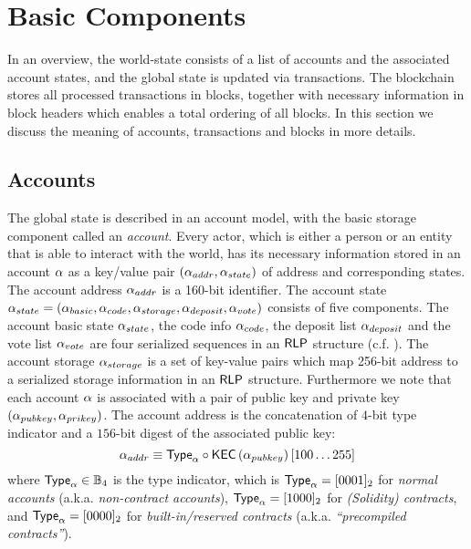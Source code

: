 

\section{Basic Components}
In an overview, the {\name} world-state consists of a list of accounts and the associated account states, and the global state is updated via transactions. 
The {\name} blockchain stores all processed transactions in blocks, together with necessary information in block headers which enables a total ordering of all blocks.
In this section we discuss the meaning of accounts, transactions and blocks in more details.


\subsection{Accounts}
\label{subsec:accounts}

The {\name} global state is described in an account model, with the basic storage component called an \emph{account}.
Every actor, which is either a person or an entity that is able to interact with the {\name} world, has its necessary information stored in an account $\mathbf{\alpha}$  as a key/value pair $(\mathbf{\alpha}_{addr}, \mathbf{\alpha}_{state})$ of address and corresponding states. 
The account address $\mathbf{\alpha}_{addr}$ is a 160-bit identifier. The account state $\mathbf{\alpha}_{state}= (\mathbf{\alpha}_{basic},\mathbf{\alpha}_{code}, \mathbf{\alpha}_{storage},\mathbf{\alpha}_{deposit},\mathbf{\alpha}_{vote})$ consists of five components. The account basic state $\mathbf{\alpha}_{state}$, the code info $\mathbf{\alpha}_{code}$, the deposit list $\mathbf{\alpha}_{deposit}$ and the vote list $\mathbf{\alpha}_{vote}$ are four serialized sequences in an $\mathsf{RLP}$ structure (c.f. \cite{ETH_yellow}). The account storage $\mathbf{\alpha}_{storage}$ is a set of key-value pairs which map 256-bit address to a serialized storage information in an $\mathsf{RLP}$ structure. 
Furthermore we note that each account $\mathbf{\alpha}$ is associated with a pair of public key and private key $\left(\mathbf{\alpha}_{pubkey}, \mathbf{\alpha}_{prikey}\right)$.
The account address is the concatenation of $4$-bit type indicator and a $156$-bit digest of the associated public key: 
\begin{equation}\label{eq:account-address}
	\mathbf{\alpha}_{addr} \equiv \mathsf{Type}_{\mathbf{\alpha}} \circ \mathsf{KEC} \left( \mathbf{\alpha}_{pubkey} \right)[100\dots 255]
\end{equation}
where $\mathsf{Type}_{\mathbf{\alpha}}\in \mathbb{B}_4$ is the type indicator,
which is $\mathsf{Type}_{\mathbf{\alpha}}=[0001]_2$ for \emph{normal accounts} (a.k.a. \emph{non-contract accounts}), $\mathsf{Type}_{\mathbf{\alpha}}=[1000]_2$ for \emph{(Solidity) contracts},
and $\mathsf{Type}_{\mathbf{\alpha}}=[0000]_2$ for \emph{built-in/reserved contracts} (a.k.a. \emph{``precompiled contracts''}).




